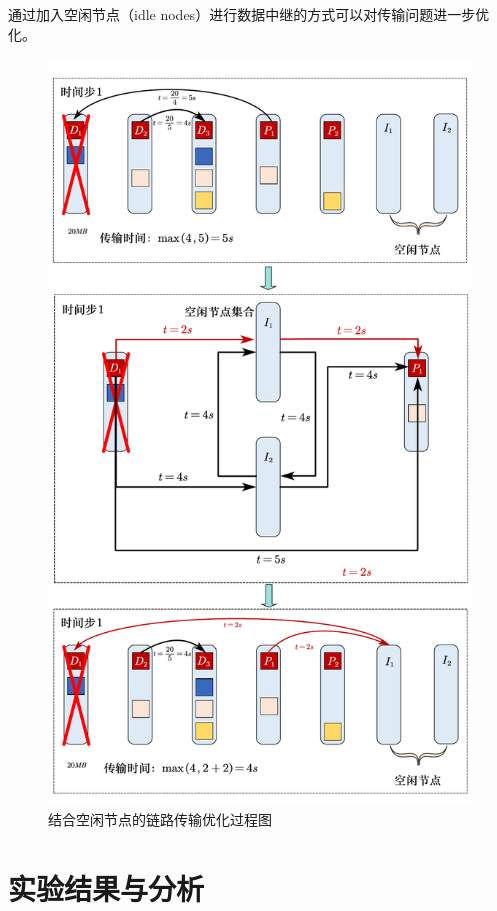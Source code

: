通过加入空闲节点（idle nodes）进行数据中继的方式可以对传输问题进一步优化。

\begin{figure}[htbp]
	\centering
	\includegraphics [scale=0.5]{figures/3.5.pdf}
	\caption{结合空闲节点的链路传输优化过程图}
	\label{fig:3.5}
\end{figure}

\section{实验结果与分析}

